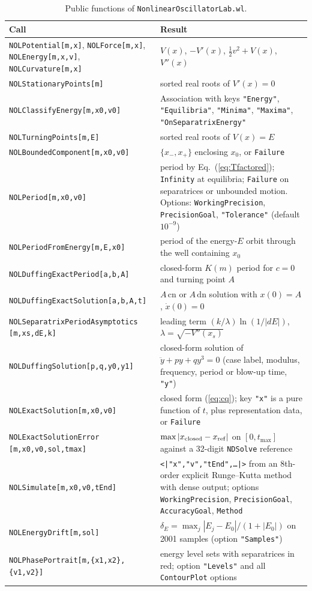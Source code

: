 \documentclass[11pt]{article}
\begin{document}
\begin{table}[H]\centering\footnotesize
\caption{Public functions of \texttt{NonlinearOscillatorLab.wl}.}\label{tab:wlref}
\begin{tabular}{@{}p{}p{}@{}}\toprule
Call & Result\\\midrule
\texttt{NOLPotential[m,x]}, \texttt{NOLForce[m,x]}, \texttt{NOLEnergy[m,x,v]}, \texttt{NOLCurvature[m,x]} & $V(x)$, $-V'(x)$, $\tfrac12v^2+V(x)$, $V''(x)$\\
\texttt{NOLStationaryPoints[m]} & sorted real roots of $V'(x)=0$\\
\texttt{NOLClassifyEnergy[m,x0,v0]} & Association with keys \texttt{"Energy"}, \texttt{"Equilibria"}, \texttt{"Minima"}, \texttt{"Maxima"}, \texttt{"OnSeparatrixEnergy"}\\
\texttt{NOLTurningPoints[m,E]} & sorted real roots of $V(x)=E$\\
\texttt{NOLBoundedComponent[m,x0,v0]} & $\{x_-,x_+\}$ enclosing $x_0$, or \texttt{Failure}\\
\texttt{NOLPeriod[m,x0,v0]} & period by Eq.~(\ref{eq:Tfactored}); \texttt{Infinity} at equilibria; \texttt{Failure} on separatrices or unbounded motion. Options: \texttt{WorkingPrecision}, \texttt{PrecisionGoal}, \texttt{"Tolerance"} (default $10^{-9}$)\\
\texttt{NOLPeriodFromEnergy[m,E,x0]} & period of the energy-$E$ orbit through the well containing $x_0$\\
\texttt{NOLDuffingExactPeriod[a,b,A]} & closed-form $K(m)$ period for $c=0$ and turning point $A$\\
\texttt{NOLDuffingExactSolution[a,b,A,t]} & $A\,\mathrm{cn}$ or $A\,\mathrm{dn}$ solution with $x(0)=A$, $\dot x(0)=0$\\
\texttt{NOLSeparatrixPeriodAsymptotics} \texttt{[m,xs,dE,k]} & leading term $(k/\lambda)\ln(1/|dE|)$, $\lambda=\sqrt{-V''(x_s)}$\\
\texttt{NOLDuffingSolution[p,q,y0,y1]} & closed-form solution of $\ddot y+py+qy^3=0$ (case label, modulus, frequency, period or blow-up time, \texttt{"y"})\\
\texttt{NOLExactSolution[m,x0,v0]} & closed form (\ref{eq:cq}); key \texttt{"x"} is a pure function of $t$, plus representation data, or \texttt{Failure}\\
\texttt{NOLExactSolutionError} \texttt{[m,x0,v0,sol,tmax]} & $\max|x_{\rm closed}-x_{\rm ref}|$ on $[0,t_{\max}]$ against a 32-digit \texttt{NDSolve} reference\\
\texttt{NOLSimulate[m,x0,v0,tEnd]} & \texttt{<|"x","v","tEnd",\dots|>} from an 8th-order explicit Runge--Kutta method with dense output; options \texttt{WorkingPrecision}, \texttt{PrecisionGoal}, \texttt{AccuracyGoal}, \texttt{Method}\\
\texttt{NOLEnergyDrift[m,sol]} & $\delta_E=\max_j|E_j-E_0|/(1+|E_0|)$ on 2001 samples (option \texttt{"Samples"})\\
\texttt{NOLPhasePortrait[m,\{x1,x2\},\{v1,v2\}]} & energy level sets with separatrices in red; option \texttt{"Levels"} and all \texttt{ContourPlot} options\\\bottomrule
\end{tabular}\end{table}
\end{document}
